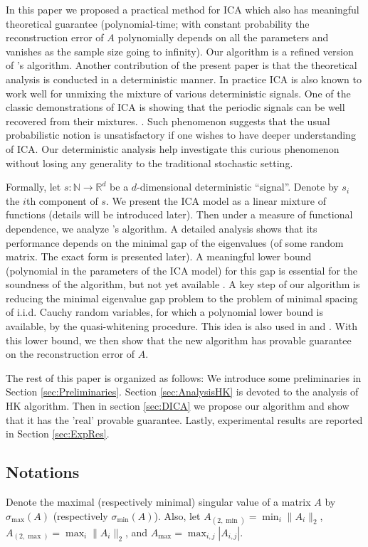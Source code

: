 \documentclass[twoside]{article}
\newcommand{\ra}{\rightarrow}
\newcommand{\real}{\mathbb{R}}
\renewcommand{\natural}{\mathbb{N}}
\theoremstyle{definition}
\begin{document}
In this paper we proposed a practical method for ICA which also has meaningful theoretical guarantee (polynomial-time; with constant probability the reconstruction error of $A$ polynomially depends on all the parameters and vanishes as the sample size going to infinity).
Our algorithm is a refined version of \cite{hsu2013learning}'s algorithm.  
Another contribution of the present paper is that the theoretical analysis is conducted in a deterministic manner. 
In practice ICA is also known to work well for unmixing the mixture of various deterministic signals. 
One of the classic demonstrations of ICA is showing that the periodic signals can be well recovered from their mixtures. \citep{HyvOja00}.
Such phenomenon suggests that the usual probabilistic notion is unsatisfactory if one wishes to have deeper understanding of ICA.   
Our deterministic analysis help investigate this curious phenomenon without losing any generality to the traditional stochastic setting. 

Formally, let $s:\natural \ra \real^d$ be a $d$-dimensional deterministic ``signal''. 
Denote by $s_i$ the $i$th component of $s$.
We present the ICA model as a linear mixture of functions (details will be introduced later).
Then under a measure of functional dependence, we analyze  \citep{hsu2013learning}'s algorithm.
A detailed analysis shows that its performance depends on the minimal gap of the eigenvalues (of some random matrix. The exact form is presented later).
A meaningful lower bound  (polynomial in the parameters of the ICA model) for this gap is essential for the soundness of the algorithm, but not yet available \citep{cardoso1999high}.
A key step of our algorithm is reducing the minimal eigenvalue gap problem to the problem of minimal spacing of i.i.d. Cauchy random variables, for which a polynomial lower bound is available, by the quasi-whitening procedure.
This idea is also used in \citep{frieze1996learning} and \citep{arora2012provable}.
With this lower bound, we then show that the new algorithm has provable guarantee on the reconstruction error of $A$. 

The rest of this paper is organized as follows: 
We introduce some preliminaries in Section \ref{sec:Preliminaries}. Section \ref{sec:AnalysisHK} is devoted to the analysis of HK algorithm. Then in section \ref{sec:DICA} we propose our algorithm and show that it has the 'real' provable guarantee.
Lastly, experimental results are reported in Section \ref{sec:ExpRes}.

\subsection{Notations}
Denote the maximal (respectively minimal) singular value of a matrix $A$ by  $\sigma_{\max}(A)$ (respectively $\sigma_{\min}(A)$). Also, let $A_{(2,\min)} = \min_{i} \|A_i\|_2$, $A_{(2,\max)} = \max_{i} \|A_i\|_2$, and $A_{\max} = \max_{i,j} |A_{i,j}|$.
\end{document}
